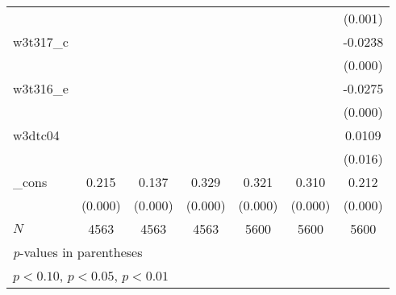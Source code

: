 {\begin{tabular}{l*{6}{c}}
            &                     &                     &                     &                     &                     &     (0.001)         \\
[1em]
w3t317\_c    &                     &                     &                     &                     &                     &     -0.0238\sym{***}\\
            &                     &                     &                     &                     &                     &     (0.000)         \\
[1em]
w3t316\_e    &                     &                     &                     &                     &                     &     -0.0275\sym{***}\\
            &                     &                     &                     &                     &                     &     (0.000)         \\
[1em]
w3dtc04     &                     &                     &                     &                     &                     &      0.0109\sym{**} \\
            &                     &                     &                     &                     &                     &     (0.016)         \\
[1em]
\_cons      &       0.215\sym{***}&       0.137\sym{***}&       0.329\sym{***}&       0.321\sym{***}&       0.310\sym{***}&       0.212\sym{***}\\
            &     (0.000)         &     (0.000)         &     (0.000)         &     (0.000)         &     (0.000)         &     (0.000)         \\
\hline
\(N\)       &        4563         &        4563         &        4563         &        5600         &        5600         &        5600         \\
\hline\hline
\multicolumn{7}{l}{\footnotesize \textit{p}-values in parentheses}\\
\multicolumn{7}{l}{\footnotesize \sym{*} \(p<0.10\), \sym{**} \(p<0.05\), \sym{***} \(p<0.01\)}\\
\end{tabular}
}
